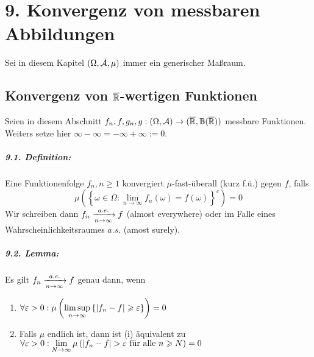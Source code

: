 \documentclass[11pt]{report}
\begin{document}
\chapter*{9. Konvergenz von messbaren Abbildungen}
Sei in diesem Kapitel $(\Omega,\mathcal{A},\mu)$ immer ein generischer Ma\ss{}raum.
\section*{Konvergenz von $\overline{\mathbb{R}}$-wertigen Funktionen}
Seien in diesem Abschnitt $f_n,f,g_n,g:(\Omega,\mathcal{A})\to(\overline{\mathbb{R}},\mathbb{B}(\overline{\mathbb{R}}))$ messbare Funktionen. Weiters setze hier $\infty-\infty=-\infty+\infty:=0$.

\paragraph{9.1. Definition:} Eine Funktionenfolge $f_n,n\geq1$ konvergiert $\mu$-fast-\"uberall (kurz f.\"u.) gegen $f$, falls
$$\mu\left(\left\{\omega\in\Omega:\lim_{n\to\infty}f_n(\omega)=f(\omega)\right\}^c\right)=0$$
Wir schreiben dann $f_n\nto{a.e.}{n\to\infty}f$ (almost everywhere) oder im Falle eines Wahrscheinlichkeitsraumes $a.s.$ (amost surely).

\paragraph{9.2. Lemma:} Es gilt $f_n\nto{a.e.}{n\to\infty}f$ genau dann, wenn
\begin{enumerate}[label=(\roman*)]
    \item $\forall\varepsilon>0:\mu\left(\displaystyle\limsup_{n\to\infty}\left\{|f_n-f|\geqslant\varepsilon\right\}\right)=0$
    \item Falls $\mu$ endlich ist, dann ist (i) \"aquivalent zu $\forall\eps>0:\displaystyle\lim_{N\to\infty}\mu\left(|f_n-f|>\eps\text{ f\"ur alle }n\geq N\right)=0$
\end{enumerate}
\end{document}
